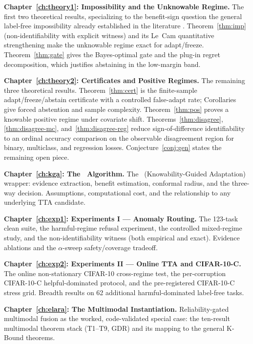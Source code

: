 \medskip
\noindent\textbf{Chapter~\ref{ch:theory1}: Impossibility and the Unknowable Regime.}
The first two theoretical results, specializing to the benefit-sign question the general
label-free impossibility already established in the literature
\cite{garg2022atc,kalai2021abstain}.
Theorem~\ref{thm:imp} (non-identifiability with explicit witness) and its Le~Cam
quantitative strengthening make the unknowable regime exact for adapt/freeze.
Theorem~\ref{thm:gate} gives the Bayes-optimal gate and the plug-in regret
decomposition, which justifies abstaining in the low-margin band.

\medskip
\noindent\textbf{Chapter~\ref{ch:theory2}: Certificates and Positive Regimes.}
The remaining three theoretical results.
Theorem~\ref{thm:cert} is the finite-sample adapt/freeze/abstain certificate with
a controlled false-adapt rate; Corollaries give forced abstention and sample
complexity.
Theorem~\ref{thm:pos} proves a knowable positive regime under covariate shift.
Theorems~\ref{thm:disagree}, \ref{thm:disagree-mc}, and~\ref{thm:disagree-reg}
reduce sign-of-difference identifiability to an ordinal accuracy comparison on the
observable disagreement region for binary, multiclass, and regression losses.
Conjecture~\ref{conj:gen} states the remaining open piece.

\medskip
\noindent\textbf{Chapter~\ref{ch:kga}: The \KGA\ Algorithm.}
The \KGA\ (Knowability-Guided Adaptation) wrapper: evidence extraction,
benefit estimation, conformal radius, and the three-way decision.
Assumptions, computational cost, and the relationship to any underlying TTA
candidate.

\medskip
\noindent\textbf{Chapter~\ref{ch:exp1}: Experiments I --- Anomaly Routing.}
The 123-task clean suite, the harmful-regime refusal experiment, the controlled
mixed-regime study, and the non-identifiability witness (both empirical and exact).
Evidence ablations and the $\alpha$-sweep safety/coverage tradeoff.

\medskip
\noindent\textbf{Chapter~\ref{ch:exp2}: Experiments II --- Online TTA and CIFAR-10-C.}
The online non-stationary CIFAR-10 cross-regime test, the per-corruption CIFAR-10-C
helpful-dominated protocol, and the pre-registered CIFAR-10-C stress grid.
Breadth results on 62 additional harmful-dominated label-free tasks.

\medskip
\noindent\textbf{Chapter~\ref{ch:elara}: The Multimodal Instantiation.}
Reliability-gated multimodal fusion as the worked, code-validated special case:
the ten-result multimodal theorem stack (T1--T9, GDR) and its mapping to the general
K-Bound theorems.

